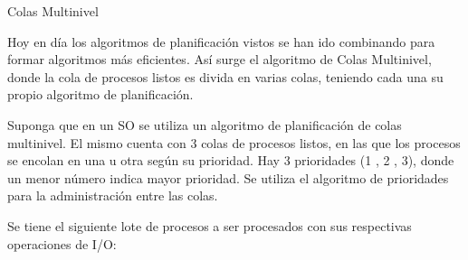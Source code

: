\begin{questions}
\question Colas Multinivel

\hspace{20pt} Hoy en día los algoritmos de planificación vistos se han ido combinando para formar algoritmos más eficientes. Así surge el algoritmo de Colas Multinivel, donde la cola de procesos listos es divida en varias colas, teniendo cada una su propio algoritmo de planificación.

\question Suponga que en un SO se utiliza un algoritmo de planificación de colas multinivel. El mismo cuenta con 3 colas de procesos listos, en las que los procesos se encolan en una u otra según su prioridad. Hay 3 prioridades (1 , 2 , 3), donde un menor número indica mayor prioridad. \label{ejer_sched_cola_multi_1}
\hspace{20pt} Se utiliza el algoritmo de prioridades para la administración entre las colas.

\hspace{20pt} Se tiene el siguiente lote de procesos a ser procesados con sus respectivas operaciones de I/O:

\begin{table}[h]
  \centering
\end{table}


\end{questions}
